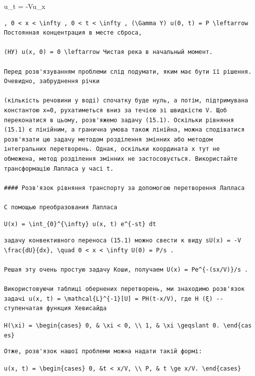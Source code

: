 \documentclass[
  ukrainian,
]{article}
\begin{document}
u\_t = -Vu\_x

\begin{verbatim}
, 0 < x < \infty , 0 < t < \infty , (\Gamma Y) u(0, t) = P \leftarrow Постоянная концентрация в месте сброса,

(НУ) u(x, 0) = 0 \leftarrow Чистая река в начальный момент.

Перед розв'язуванням проблеми слід подумати, яким має бути її рішення. Очевидно, забруднення річки

(кількість речовини у воді) спочатку буде нуль, а потім, підтримувана константою x=0, рухатиметься вниз за течією зі швидкістю V. Щоб переконатися в цьому, розв'яжемо задачу (15.1). Оскільки рівняння (15.1) є лінійним, а гранична умова також лінійна, можна сподіватися розв'язати цю задачу методом розділення змінних або методом інтегральних перетворень. Однак, оскільки координата x тут не обмежена, метод розділення змінних не застосовується. Використайте трансформацію Лапласа у часі t.

#### Розв'язок рівняння транспорту за допомогою перетворення Лапласа

С помощью преобразования Лапласа
\end{verbatim}

\texttt{U(x)\ =\ \textbackslash{}int\_\{0\}\^{}\{\textbackslash{}infty\}\ u(x,\ t)\ e\^{}\{-st\}\ dt}

\begin{verbatim}
задачу конвективного переноса (15.1) можно свести к виду sU(x) = -V \frac{dU}{dx}, \quad 0 < x < \infty U(0) = P/s .

Решая эту очень простую задачу Коши, получаем U(x) = Pe^{-(sx/V)}/s .

Використовуючи таблиці обернених перетворень, ми знаходимо розв'язок задачі u(x, t) = \mathcal{L}^{-1}[U] = PH(t-x/V), где Н (ξ) -- ступенчатая функция Хевисайда
\end{verbatim}

\texttt{H(\textbackslash{}xi)\ =\ \textbackslash{}begin\{cases\}\ 0,\ \&\ \textbackslash{}xi\ \textless{}\ 0,\ \textbackslash{}\textbackslash{}\ 1,\ \&\ \textbackslash{}xi\ \textbackslash{}geqslant\ 0.\ \textbackslash{}end\{cases\}}

\begin{verbatim}
Отже, розв'язок нашої проблеми можна надати такій формі:
\end{verbatim}

\texttt{u(x,\ t)\ =\ \textbackslash{}begin\{cases\}\ 0,\ \&t\ \textless{}\ x/V,\ \textbackslash{}\textbackslash{}\ P,\ \&\ t\ \textbackslash{}ge\ x/V.\ \textbackslash{}end\{cases\}}
\end{document}
